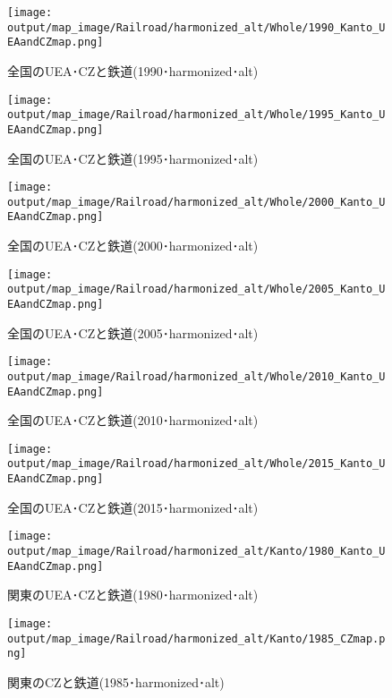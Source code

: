\documentclass{ltjsarticle}
\begin{document}
\begin{figure}[pbth]
  \centering
  \texttt{[image: output/map\_image/Railroad/harmonized\_alt/Whole/1990\_Kanto\_UEAandCZmap.png]}
  \caption{\label{altham:1990:allCZandUEA:Rail}全国のUEA･CZと鉄道(1990･harmonized･alt)}
\end{figure}


\begin{figure}[pbth]
  \centering
  \texttt{[image: output/map\_image/Railroad/harmonized\_alt/Whole/1995\_Kanto\_UEAandCZmap.png]}
  \caption{\label{altham:1995:allCZandUEA:Rail}全国のUEA･CZと鉄道(1995･harmonized･alt)}
\end{figure}


\begin{figure}[pbth]
  \centering
  \texttt{[image: output/map\_image/Railroad/harmonized\_alt/Whole/2000\_Kanto\_UEAandCZmap.png]}
  \caption{\label{altham:2000:allCZandUEA:Rail}全国のUEA･CZと鉄道(2000･harmonized･alt)}
\end{figure}


\begin{figure}[pbth]
  \centering
  \texttt{[image: output/map\_image/Railroad/harmonized\_alt/Whole/2005\_Kanto\_UEAandCZmap.png]}
  \caption{\label{altham:2005:allCZandUEA:Rail}全国のUEA･CZと鉄道(2005･harmonized･alt)}
\end{figure}


\begin{figure}[pbth]
  \centering
  \texttt{[image: output/map\_image/Railroad/harmonized\_alt/Whole/2010\_Kanto\_UEAandCZmap.png]}
  \caption{\label{altham:2010:allCZandUEA:Rail}全国のUEA･CZと鉄道(2010･harmonized･alt)}
\end{figure}


\begin{figure}[pbth]
  \centering
  \texttt{[image: output/map\_image/Railroad/harmonized\_alt/Whole/2015\_Kanto\_UEAandCZmap.png]}
  \caption{\label{altham:2015:allCZandUEA:Rail}全国のUEA･CZと鉄道(2015･harmonized･alt)}
\end{figure}

\begin{figure}[pbth]
  \centering
  \texttt{[image: output/map\_image/Railroad/harmonized\_alt/Kanto/1980\_Kanto\_UEAandCZmap.png]}
  \caption{\label{altham:1980:KanCZandUEA:Rail}関東のUEA･CZと鉄道(1980･harmonized･alt)}
\end{figure}


\begin{figure}[pbth]
  \centering
  \texttt{[image: output/map\_image/Railroad/harmonized\_alt/Kanto/1985\_CZmap.png]}
  \caption{\label{altham:1985:KanCZandUEA:Rail}関東のCZと鉄道(1985･harmonized･alt)}
\end{figure}
\end{document}
